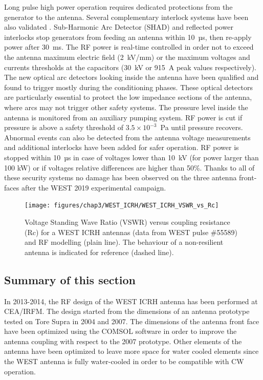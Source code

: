 {Long pulse high power operation requires dedicated protections from the generator to the antenna. Several complementary interlock systems have been also validated \cite{helou2019}. Sub-Harmonic Arc Detector (SHAD) and reflected power interlocks stop generators from feeding an antenna within 10~µs, then re-apply power after 30~ms. The RF power is real-time controlled in order not to exceed the antenna maximum electric field (2~kV/mm) or the maximum voltages and currents thresholds at the capacitors (30~kV or 915~A peak values respectively). The new optical arc detectors looking inside the antenna have been qualified and found to trigger mostly during the conditioning phases. These optical detectors are particularly essential to protect the low impedance sections of the antenna, where arcs may not trigger other safety systems. The pressure level inside the antenna is monitored from an auxiliary pumping system.  RF power is cut if pressure is above a safety threshold of $3.5\times10^{-3}$~Pa until pressure recovers. Abnormal events can also be detected from the antenna voltage measurements and additional interlocks have been added for safer operation. RF power is stopped within 10~µs in case of voltages lower than 10~kV (for power larger than 100 kW) or if voltages relative differences are higher than 50\%. Thanks to all of these security systems no damage has been observed on the three antenna front-faces after the WEST 2019 experimental campaign.

\begin{figure}[h]
	\centering
	\texttt{[image: figures/chap3/WEST\_ICRH/WEST\_ICRH\_VSWR\_vs\_Rc]}
	\caption{Voltage Standing Wave Ratio (VSWR) versus coupling resistance (Rc) for a WEST ICRH antennas (data from WEST pulse \#55589) and RF modelling (plain line). The behaviour of a non-resilient antenna is indicated for reference (dashed line).}
	\label{fig:westicrhvswrvsrc}
\end{figure}


\subsection{Summary of this section}
In 2013-2014, the RF design of the WEST ICRH antenna has been performed at CEA/IRFM. The design started from the dimensions of an antenna prototype tested on Tore Supra in 2004 and 2007. The dimensions of the antenna front face have been optimized using the COMSOL software in order to improve the antenna coupling with respect to the 2007 prototype. Other elements of the antenna have been optimized to leave more space for water cooled elements since the WEST antenna is fully water-cooled in order to be compatible with CW operation. 

}
